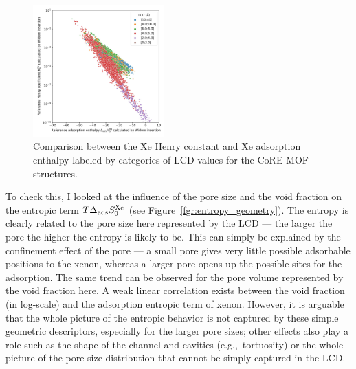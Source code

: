\documentclass[main.tex]{subfiles}
\begin{document}
\begin{figure}
  \centering
  \includegraphics[width=0.45\textwidth]{figures/2-thermo/H_Xe_widom_vs_K_Xe_widom_overview.jpg}
  \caption{Comparison between the Xe Henry constant and Xe adsorption enthalpy labeled by categories of LCD values for the CoRE MOF structures.}\label{fgr:henry_enthalpy}
\end{figure}

To check this, I looked at the influence of the pore size and the void fraction on the entropic term $T\Delta_{\text{ads}}S^{\text{Xe}}_{\text{0}}$ (see Figure~\ref{fgr:entropy_geometry}). The entropy is clearly related to the pore size here represented by the LCD --- the larger the pore the higher the entropy is likely to be. This can simply be explained by the confinement effect of the pore --- a small pore gives very little possible adsorbable positions to the xenon, whereas a larger pore opens up the possible sites for the adsorption. The same trend can be observed for the pore volume represented by the void fraction here. A weak linear correlation exists between the void fraction (in log-scale) and the adsorption entropic term of xenon. However, it is arguable that the whole picture of the entropic behavior is not captured by these simple geometric descriptors, especially for the larger pore sizes; other effects also play a role such as the shape of the channel and cavities (e.g.,\ tortuosity) or the whole picture of the pore size distribution that cannot be simply captured in the LCD.
\end{document}
